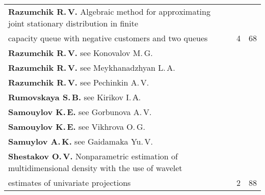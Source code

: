 {\begin{tabular}{p{397pt}rr}
\textbf{Razumchik R.\,V.} Algebraic method for approximating joint stationary distribution
in finite\linebreak
\\[-12pt]
\hspace*{21pt}capacity queue with negative customers and two queues&4&68\\
\textbf{Razumchik R.\,V.} see Konovalov M.\,G.&&\\
\textbf{Razumchik R.\,V.} see Meykhanadzhyan L.\,A.&&\\
\textbf{Razumchik R.\,V.} see Pechinkin A.\,V.&&\\
\textbf{Rumovskaya S.\,B.} see Kirikov I.\,А.&&\\
\textbf{Samouylov K.\,E.} see Gorbunova A.\,V.&&\\
\textbf{Samouylov K.\,E.} see Vikhrova O.\,G.&&\\
\textbf{Samuylov A.\,K.} see Gaidamaka Yu.\,V.&&\\
\textbf{Shestakov O.\,V.} Nonparametric estimation of multidimensional density
with the use of wavelet\linebreak
\\[-12pt]
\hspace*{21pt}estimates of univariate projections&2&88\\
\end{tabular}
}
\pagebreak

\def\leftfootline{\small{\textbf{\thepage}
\hfill INFORMATIKA I EE PRIMENENIYA~--- INFORMATICS AND APPLICATIONS\ \ \ 2015\
\ \ volume~9\ \ \ issue\ 4}
}%
 \def\rightfootline{\small{INFORMATIKA I EE PRIMENENIYA~---
INFORMATICS AND APPLICATIONS\ \ \ 2015\ \ \ volume~9\ \ \ issue\ 4
\hfill \textbf{\thepage}}}

\def\leftkol{2015 AUTHOR INDEX} %

\def\rightkol{2015 AUTHOR INDEX} %


